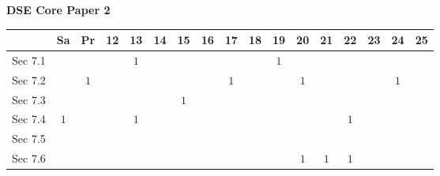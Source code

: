\documentclass[12pt, a4paper]{article}
\begin{document}
\begin{absolutelynopagebreak}
\begin{center}
\textbf{DSE Core Paper 2}
\end{center}
\begin{center}
\begin{tabular}{|l|c|c|c|c|c|c|c|c|c|c|c|c|c|c|c|c|}
\hline
        & Sa & Pr & 12 & 13 & 14 & 15 & 16 & 17 & 18 & 19 & 20 & 21 & 22 & 23 & 24 & 25 \\\hline\hline
Sec 7.1 &  &  &  &  $1$ &  &  &  &  &  &  $1$ &  &  &  &  &  &  \\\hline
Sec 7.2 &  &  $1$ &  &  &  &  &  &  $1$ &  &  &  $1$ &  &  &  &  $1$ &  \\\hline
Sec 7.3 &  &  &  &  &  &  $1$ &  &  &  &  &  &  &  &  &  &  \\\hline
Sec 7.4 &  $1$ &  &  &  $1$ &  &  &  &  &  &  &  &  &  $1$ &  &  &  \\\hline
Sec 7.5 &  &  &  &  &  &  &  &  &  &  &  &  &  &  &  &  \\\hline
Sec 7.6 &  &  &  &  &  &  &  &  &  &  &  $1$ &  $1$ &  $1$ &  &  &  \\\hline
\end{tabular}
\end{center}
\end{absolutelynopagebreak}
\end{document}

